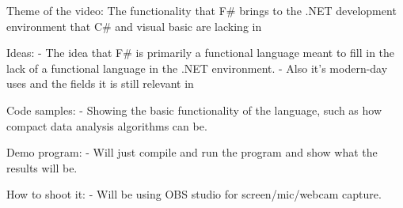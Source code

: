 Theme of the video: 	The functionality that F# brings to the .NET development environment that C# and visual basic are lacking in

Ideas: 			- The idea that F# is primarily a functional language meant to fill in the lack of a functional language in the .NET environment.
       			- Also it's modern-day uses and the fields it is still relevant in

Code samples:		- Showing the basic functionality of the language, such as how compact data analysis algorithms can be.

Demo program:		- Will just compile and run the program and show what the results will be.

How to shoot it:	- Will be using OBS studio for screen/mic/webcam capture.
